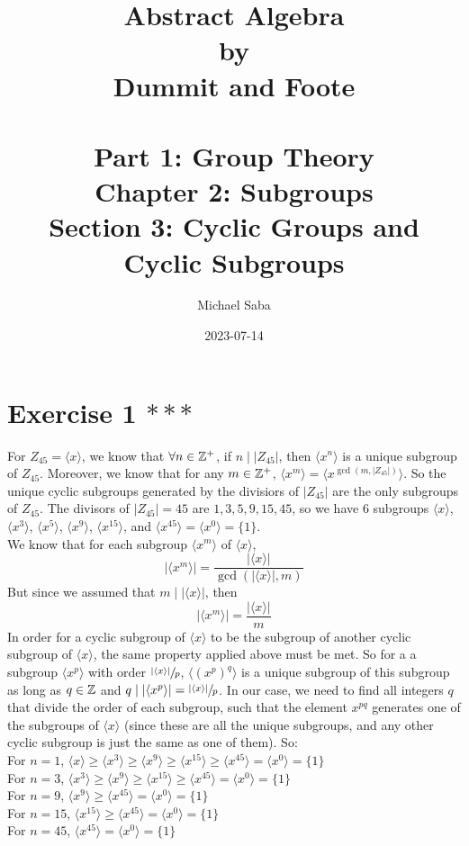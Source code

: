 \documentclass[12pt]{article}
\title{%
    \Huge Abstract Algebra \\
    \large by \\
    \Large Dummit and Foote \\~\\
    \huge Part 1: Group Theory \\
    \LARGE Chapter 2: Subgroups \\
    \Large Section 3: Cyclic Groups and Cyclic Subgroups
}
\date{2023-07-14}
\author{Michael Saba}
\begin{document}
    \maketitle
    \newpage
    \setlength{\parindent}{0pt}

    \section*{Exercise 1 $***$}
    For $Z_{45} = \langle x \rangle$,
    we know that $\forall n \in \mathbb{Z}^+$,
    if $n \mid |Z_{45}|$,
    then $\langle x^n \rangle$ is a unique subgroup of $Z_{45}$.
    Moreover, we know that for any $m \in \mathbb{Z}^+$,
    $\langle x^m \rangle = \langle x^{\gcd(m, |Z_{45}|)} \rangle$.
    So the unique cyclic subgroups generated by the divisiors of $|Z_45|$
    are the only subgroups of $Z_{45}$.
    The divisors of $|Z_{45}| = 45$ are $1, 3, 5, 9, 15, 45$,
    so we have 6 subgroups $\langle x \rangle$, 
    $\langle x^3 \rangle$, $\langle x^5 \rangle$,
    $\langle x^9 \rangle$, $\langle x^{15} \rangle$,
    and $\langle x^{45} \rangle = \langle x^0 \rangle = \{1\}$. \\
    We know that for each subgroup
    $\langle x^m \rangle$ of $\langle x \rangle$,
    \[ |\langle x^m \rangle|
    = \dfrac{|\langle x \rangle|}{\gcd(|\langle x \rangle|, m)} \]
    But since we assumed that $m \mid |\langle x \rangle|$,
    then 
    \[ |\langle x^m \rangle|
    = \dfrac{|\langle x \rangle|}{m} \]
    In order for a cyclic subgroup of $\langle x \rangle$
    to be the subgroup of another cyclic subgroup of $\langle x \rangle$,
    the same property applied above must be met.
    So for a a subgroup $\langle x^p \rangle$ with order 
    $\sfrac{|\langle x \rangle|}{p}$,
    $\langle (x^p)^q \rangle$ is a unique subgroup of this subgroup
    as long as $q \in \mathbb{Z}$ and $q \mid |\langle x^p \rangle|
    = \sfrac{|\langle x \rangle|}{p}$.
    In our case, we need to find all integers $q$
    that divide the order of each subgroup,
    such that the element $x^{pq}$ generates one of the subgroups
    of $\langle x \rangle$
    (since these are all the unique subgroups, and any other cyclic
    subgroup is just the same as one of them).
    So: \\
    For $n = 1$, $\langle x \rangle
    \geqslant \langle x^3 \rangle 
    \geqslant \langle x^9 \rangle
    \geqslant \langle x^{15} \rangle
    \geqslant \langle x^{45} \rangle = \langle x^0 \rangle = \{1\}$ \\
    For $n = 3$, $\langle x^3 \rangle 
    \geqslant \langle x^9 \rangle
    \geqslant \langle x^{15} \rangle
    \geqslant \langle x^{45} \rangle = \langle x^0 \rangle = \{1\}$ \\
    For $n = 9$, $\langle x^9 \rangle
    \geqslant \langle x^{45} \rangle = \langle x^0 \rangle = \{1\}$ \\
    For $n = 15$, $\langle x^{15} \rangle
    \geqslant \langle x^{45} \rangle = \langle x^0 \rangle = \{1\}$ \\
    For $n = 45$, $\langle x^{45} \rangle = \langle x^0 \rangle = \{1\}$ \\
\end{document}

